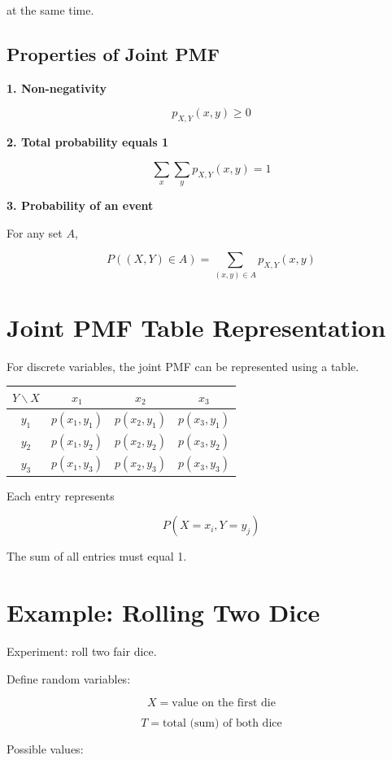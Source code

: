 \documentclass[12pt]{article}
\begin{document}
at the same time.

\subsection{Properties of Joint PMF}

\textbf{1. Non-negativity}

\[
p_{X,Y}(x,y) \ge 0
\]

\textbf{2. Total probability equals 1}

\[
\sum_x \sum_y p_{X,Y}(x,y) = 1
\]

\textbf{3. Probability of an event}

For any set $A$,

\[
P((X,Y)\in A)=\sum_{(x,y)\in A} p_{X,Y}(x,y)
\]

\section{Joint PMF Table Representation}

For discrete variables, the joint PMF can be represented using a table.

\begin{center}
\begin{tabular}{c|ccc}
\toprule
$Y \backslash X$ & $x_1$ & $x_2$ & $x_3$ \\
\midrule
$y_1$ & $p(x_1,y_1)$ & $p(x_2,y_1)$ & $p(x_3,y_1)$ \\
$y_2$ & $p(x_1,y_2)$ & $p(x_2,y_2)$ & $p(x_3,y_2)$ \\
$y_3$ & $p(x_1,y_3)$ & $p(x_2,y_3)$ & $p(x_3,y_3)$ \\
\bottomrule
\end{tabular}
\end{center}

Each entry represents

\[
P(X=x_i, Y=y_j)
\]

The sum of all entries must equal 1.

\section{Example: Rolling Two Dice}

Experiment: roll two fair dice.

Define random variables:

\[
X = \text{value on the first die}
\]

\[
T = \text{total (sum) of both dice}
\]

Possible values:
\end{document}
